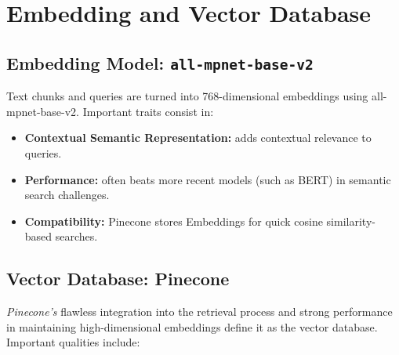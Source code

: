 \section{Embedding and Vector Database}
\label{sec:embedding_vector_db}

\subsection{Embedding Model: \texttt{all-mpnet-base-v2}}
\label{subsec:all_mpnet_base_v2}
\text Text chunks and queries are turned into 768-dimensional embeddings using all-mpnet-base-v2.  Important traits consist in:

\begin{itemize}[itemsep=2em]
  \item \textbf{Contextual Semantic Representation:} adds contextual relevance to queries.
  \item \textbf{Performance:} often beats more recent models (such as BERT) in semantic search challenges.
  \item \textbf{Compatibility:} Pinecone stores Embeddings for quick cosine similarity-based searches.
\end{itemize}

\subsection{Vector Database: Pinecone}
\label{subsec:pinecone}
\emph{Pinecone's} flawless integration into the retrieval process and strong performance in maintaining high-dimensional embeddings define it as the vector database.  Important qualities include:

